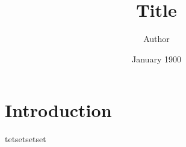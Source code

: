 \documentclass{article}
\title{Title}
\author{Author}
\date{January 1900}
\begin{document}
\maketitle

\section{Introduction}

tetsetsetset
\end{document}
